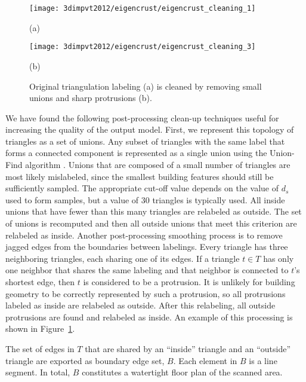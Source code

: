 \documentclass[12pt,onecolumn,oneside]{book}
\begin{document}
\begin{figure}[t]

\begin{minipage}[b]{0.49\linewidth}
  \centering
  \centerline{\texttt{[image: 3dimpvt2012/eigencrust/eigencrust\_cleaning\_1]}}
  \centerline{(a)}
\end{minipage}
\hfill
\begin{minipage}[b]{0.49\linewidth}
  \centering
  \centerline{\texttt{[image: 3dimpvt2012/eigencrust/eigencrust\_cleaning\_3]}}
  \centerline{(b)}
\end{minipage}

\caption[Post-processing floor plan triangulation.]{Original triangulation labeling (a) is cleaned by removing small unions and sharp protrusions (b).}
\label{fig:eigencrust_postprocessing}

\end{figure}

We have found the following post-processing clean-up techniques useful for increasing the quality of the output model.  First, we represent this topology of triangles as a set of unions.  Any subset of triangles with the same label that forms a connected component is represented as a single union using the Union-Find algorithm \cite{Unionfind}.  Unions that are composed of a small number of triangles are most likely mislabeled, since the smallest building features should still be sufficiently sampled.  The appropriate cut-off value depends on the value of $d_s$ used to form samples, but a value of 30 triangles is typically used.  All inside unions that have fewer than this many triangles are relabeled as outside. The set of unions is recomputed and then all outside unions that meet this criterion are relabeled as inside. Another post-processing smoothing process is to remove jagged edges from the boundaries between labelings.  Every triangle has three neighboring triangles, each sharing one of its edges.  If a triangle $t \in T$ has only one neighbor that shares the same labeling and that neighbor is connected to $t$'s shortest edge, then $t$ is considered to be a protrusion.  It is unlikely for building geometry to be correctly represented by such a protrusion, so all protrusions labeled as inside are relabeled as outside. After this relabeling, all outside protrusions are found and relabeled as inside.  An example of this processing is shown in Figure~\ref{fig:eigencrust_postprocessing}.

The set of edges in $T$ that are shared by an ``inside'' triangle and an ``outside'' triangle are exported as boundary edge set, $B$.  Each element in $B$ is a line segment.  In total, $B$ constitutes a watertight floor plan of the scanned area.
\end{document}
